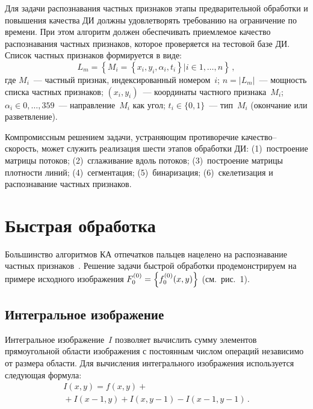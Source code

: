 \begin{multicols}{2}
  Для задачи распознавания частных признаков этапы предварительной 
обработки и повышения качества ДИ должны удовлетворять требованию на 
ограничение по времени. При этом алгоритм должен обеспечивать приемлемое 
качество распознавания частных признаков, которое проверяется на тестовой 
базе ДИ. Список частных признаков формируется в виде:
  \begin{equation}
  L_m=\left\{ M_i=\left\{ x_i,y_i,\alpha_i,t_i\right\}\vert i\in 1, \ldots , n\right\}\,,
  \label{e5-g}
  \end{equation}
где $M_i$~---  частный признак, индексированный номером~$i$; $n=\vert 
L_m\vert$~---  мощность списка частных признаков; $(x_i,y_i)$~---  координаты 
частного признака~$M_i$; $\alpha_i\in 0, \ldots , 359$~---  направление~$M_i$ как 
угол; $t_i\in \{0,1\}$~--- тип~$M_i$ (окончание или разветвление).
  
  Компромиссным решением задачи, устра\-ня\-ющим противоречие 
  ка\-че\-ст\-во--ско\-рость, может служить реализация шести этапов обработки 
ДИ: (1)~построение матрицы потоков; (2)~сглаживание вдоль потоков; 
(3)~построение матрицы плотности линий; (4)~сегментация; (5)~бинаризация; 
(6)~скелетизация и распознавание частных признаков.

\section{Быстрая обработка}

  Большинство алгоритмов КА отпечатков пальцев нацелено на распознавание 
частных признаков~\cite{1-g}. Решение задачи быстрой обработки 
продемонстрируем на примере исходного изображения $F_0^{(0)}\hm= \left\{ 
f_0^{(0)}(x,y)\right\}$ (см.\ рис.~1).

\subsection{Интегральное изображение} %
  
  Интегральное изображение~$I$ позволяет вы\-чис\-лить сумму элементов 
прямоугольной области изоб\-ра\-же\-ния с постоянным числом операций 
независимо от размера области. Для вычисления интегрального изображения 
используется следующая формула:
  \begin{multline}
  I(x,y)=f(x,y)+{}\\
  {}+I(x-1,y)+I(x,y-1)-I(x-1,y-1)\,.
  \label{e6-g}
  \end{multline}
  

\end{multicols}

